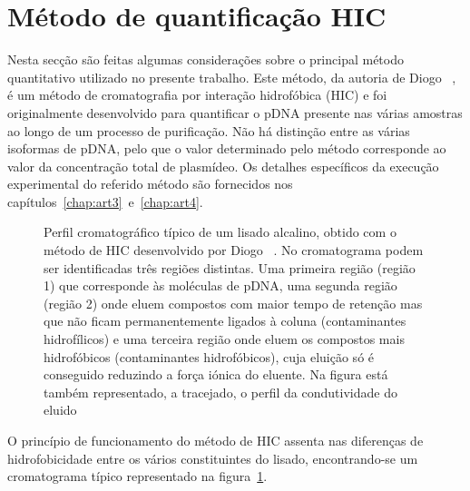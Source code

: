 \section{Método de quantificação HIC} %
\label{sec:hic_pra}
Nesta secção são feitas algumas considerações sobre o principal método quantitativo utilizado no presente trabalho. Este método, da autoria de Diogo \et\ \cite{diogo}, é um método de cromatografia por interação hidrofóbica (HIC) e foi originalmente desenvolvido para quantificar o pDNA presente nas várias amostras ao longo de um processo de purificação. Não há distinção entre as várias isoformas de pDNA, pelo que o valor determinado pelo método corresponde ao valor da concentração total de plasmídeo. Os detalhes específicos da execução experimental do referido método são fornecidos nos capítulos~\ref{chap:art3}~e~\ref{chap:art4}.
\begin{figure}
	\centering
	
	\caption[Cromatograma típico do método de quantificação HIC]{Perfil cromatográfico típico de um lisado alcalino, obtido com o método de HIC desenvolvido por Diogo \et\ \cite{diogo}. No cromatograma podem ser identificadas três regiões distintas. Uma primeira região (região 1) que corresponde às moléculas de pDNA, uma segunda região (região 2) onde eluem compostos com maior tempo de retenção mas que não ficam permanentemente ligados à coluna (contaminantes hidrofílicos) e uma terceira região onde eluem os compostos mais hidrofóbicos (contaminantes hidrofóbicos), cuja eluição só é conseguido reduzindo a força iónica do eluente. Na figura está também representado, a tracejado, o perfil da condutividade do eluido}
	\label{fig:hic_pra}
\end{figure}
O princípio de funcionamento do método de HIC assenta nas diferenças de hidrofobicidade entre os vários constituintes do lisado, encontrando-se um cromatograma típico representado na figura~\ref{fig:hic_pra}.%
